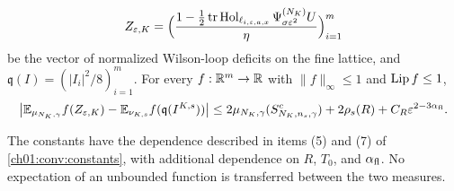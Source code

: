 \begin{lemma}
\begin{enumerate}
\[
 Z_{\varepsilon,K}=\Bigl(\frac{1-\tfrac12\operatorname{tr}\operatorname{Hol}_{\ell_{i,\varepsilon,a,x}}\Psi^{(N_K)}_{\sigma\varepsilon^2}U}{\eta}\Bigr)_{i=1}^m
\]
be the vector of normalized Wilson-loop deficits on the fine lattice, and $\mathfrak q(I)=(|I_i|^2/8)_{i=1}^m$. For every $f:\mathbb R^m\to\mathbb R$ with $\|f\|_\infty\le1$ and $\operatorname{Lip} f\le1$,
\[
 \bigl|\mathbb E_{\mu_{N_K,\gamma}}f(Z_{\varepsilon,K})-\mathbb E_{\nu_{K,s}}f(\mathfrak q(I^{K,s}))\bigr|\le2\mu_{N_K,\gamma}(S_{N_K,n_s,\gamma}^c)+2\rho_s(R)+C_R\varepsilon^{2-3\alpha_{\mathrm{fl}}}.
\]
\end{enumerate}
The constants have the dependence described in items (5) and (7) of \cref{ch01:conv:constants}, with additional dependence on $R$, $T_0$, and $\alpha_{\mathrm{fl}}$. No expectation of an unbounded function is transferred between the two measures.
\end{lemma}


